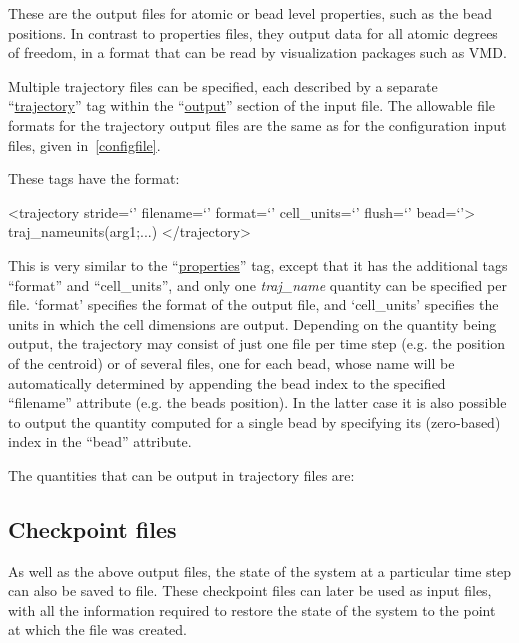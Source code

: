 \documentclass[11pt,english,fleqn]{report}
\newenvironment{code}{%
\footnotesize 
\verbatim
}{
\endverbatim
\normalsize
}
\begin{document}
These are the output files for atomic or bead level properties, such
as the bead positions. In contrast to properties files, they output data for 
all atomic degrees of freedom, in a format that can be read by visualization packages
such as VMD.

Multiple trajectory files can be specified, each described by a separate
{}``\hyperref[TRAJECTORY]{trajectory}'' tag within the 
``\hyperref[OUTPUTS]{output}'' section of the input file. 
The allowable file formats for the trajectory output files are the same as for the configuration
input files, given in~\ref{configfile}.

These tags have the format:

\begin{code}
<trajectory stride=`' filename=`' format=`' cell_units=`' flush=`' bead=`'>
   traj_name{units}(arg1;...)
</trajectory>
\end{code}

This is very similar to the 
{}``\hyperref[PROPERTIES]{properties}'' tag, except that it has the
additional tags {}``format'' and {}``cell\_units'', and only one
\emph{traj\_name} quantity can be specified per file. `format' specifies the format
of the output file, and `cell\_units' specifies the units in which
the cell dimensions are output. 
Depending on the quantity being output, the trajectory may consist of just 
one file per time step (e.g. the position of the centroid) or of several files, 
one for each bead, whose name will be automatically determined by 
appending the bead index to the specified  {}``filename'' attribute (e.g. 
the beads position). 
In the latter case it is also possible to output the quantity computed
for a single bead by specifying its (zero-based) index in the {}``bead'' attribute. 

The quantities that can be output in trajectory files are:




\subsection{Checkpoint files}

\label{checkpoint}

As well as the above output files, the state of the system at a particular
time step can also be saved to file. These checkpoint files can later be
used as input files, with all the information required to restore
the state of the system to the point at which the file was created. 
\end{document}
